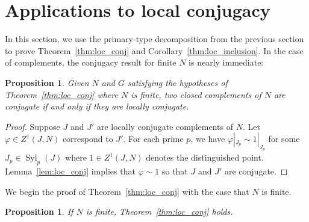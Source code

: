\documentclass{amsart}
\newtheorem{proposition}[theorem]{Proposition}
\theoremstyle{definition}
\theoremstyle{remark}
\numberwithin{equation}{section}
\renewcommand{\phi}{\varphi}
\DeclareMathOperator{\Syl}{Syl}
\begin{document}
\section{Applications to local conjugacy}
\label{s:local_coh}

In this section, we use the primary-type decomposition from the previous section to prove Theorem~\ref{thm:loc_conj} and Corollary~\ref{thm:loc_inclusion}. In the case of complements, the conjugacy result for finite $N$ is nearly immediate:

\begin{proposition}
	\label{prop:comps}
	Given $N$ and $G$ satisfying the hypotheses of Theorem~\ref{thm:loc_conj} where $N$ is finite, two closed complements of $N$ are conjugate if and only if they are locally conjugate.
\end{proposition}

\begin{proof}
	Suppose $J$ and $J'$ are locally conjugate complements of $N$. Let $\phi \in Z^1(J,N)$ correspond to $J'$. For each prime $p$, we have $\phi|_{J_p} \sim 1|_{J_p}$ for some $J_p \in \Syl_p(J)$ where $1\in Z^1(J,N)$ denotes the distinguished point. Lemma~\ref{lem:loc_conj} implies that $\phi\sim 1$ so that $J$ and $J'$ are conjugate.
\end{proof}

We begin the proof of Theorem~\ref{thm:loc_conj} with the case that $N$ is finite.

\begin{proposition}
	\label{prop:thm_main_n_nilpotent}
	If $N$ is finite, Theorem~\ref{thm:loc_conj} holds.
\end{proposition}
\end{document}

